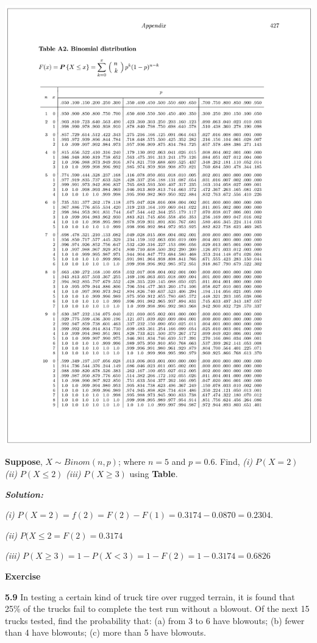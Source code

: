\documentclass[
]{article}
\begin{document}
\includegraphics{Binomial distribution_1st page.png}

\textbf{Suppose}, \(X\sim Binom(n,p)\); where \(n=5\) and \(p=0.6\). Find, \emph{(i)} \(P(X=2)\) \emph{(ii)} \(P(X \le 2)\) \emph{(iii)} \(P(X \ge 3)\) using \textbf{Table}.

\textbf{\emph{Solution:}}

\emph{(i)} \(P(X=2)=f(2)=F(2)-F(1)=0.3174-0.0870=0.2304\).

\emph{(ii)} \(P(X\le 2=F(2)=0.3174\)

\emph{(iii)} \(P(X \ge 3)=1-P(X< 3)=1-F(2)=1-0.3174=0.6826\)

\textbf{Exercise}\citep{walpole_probability_2017}

\textbf{5.9} In testing a certain kind of truck tire over rugged terrain, it is found that 25\% of the trucks fail to complete the test run without a blowout. Of the next 15 trucks tested, find the probability that: (a) from 3 to 6 have blowouts; (b) fewer than 4 have blowouts; (c) more than 5 have blowouts.
\end{document}
